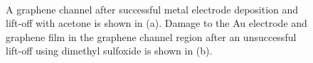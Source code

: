 \documentclass[
  a4paper,
]{scrbook}
\begin{document}
\begin{figure}
\begin{minipage}[t]{0.45\linewidth}
{{}

}

\end{minipage}%
%
\begin{minipage}[t]{0.01\linewidth}

{\centering 

~

}

\end{minipage}%

\caption[A graphene channel after successful metal electrode deposition
and lift-off, shown alongside another graphene channel where lift-off
was unsuccessful.]{\label{fig-microscope-electrodes}A graphene channel
after successful metal electrode deposition and lift-off with acetone is
shown in (a). Damage to the Au electrode and graphene film in the
graphene channel region after an unsuccessful lift-off using dimethyl
sulfoxide is shown in (b).}

\end{figure}
\end{document}
